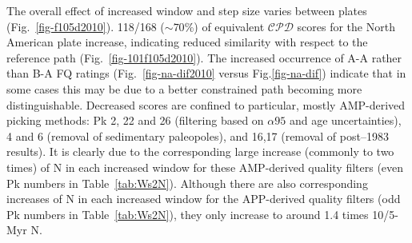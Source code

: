 The overall effect of increased window and step size varies between plates
(Fig.~\ref{fig-f105d2010}). 118/168 (${\sim}70$\%) of equivalent $\mathcal{CPD}$
scores for the North American plate increase, indicating reduced similarity with
respect to the reference path (Fig.~\ref{fig-101f105d2010}). The increased
occurrence of A-A rather than B-A FQ ratings (Fig.~\ref{fig-na-dif2010} versus
Fig.\ref{fig-na-dif}) indicate that in some cases this may be due to a better
constrained path becoming more distinguishable. Decreased scores are confined to
particular, mostly AMP-derived picking methods: Pk 2, 22 and 26 (filtering based
on ${\alpha}95$ and age uncertainties), 4 and 6 (removal of sedimentary
paleopoles), and 16,17 (removal of post–1983 results). It is clearly due to the
corresponding large increase (commonly to two times) of N in each increased
window for these AMP-derived quality filters (even Pk numbers in
Table~\ref{tab:Ws2N}). Although there are also corresponding increases of N in
each increased window for the APP-derived quality filters (odd Pk numbers in
Table~\ref{tab:Ws2N}), they only increase to around 1.4 times 10/5-Myr N.

